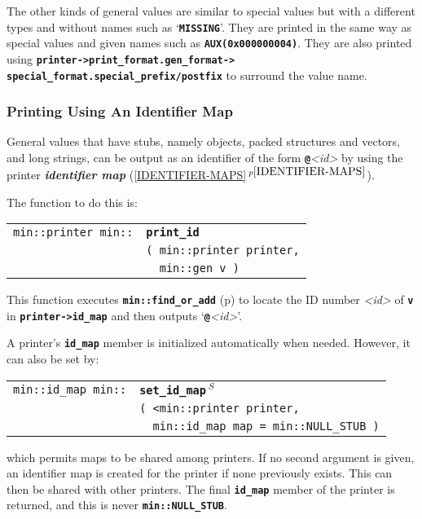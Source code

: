 \documentclass[12pt]{article}
\makeatletter
\newcommand{\TT}[1]{{\tt \bfseries #1}}
\newcommand{\key}[1]{{\bf \em #1}\index{#1}}
\newcommand{\ttindex}[1]{\index{#1@{\tt #1}}}
\newcommand{\itemref}[1]{\ref{#1}$\,^{p\pageref{#1}}$}
\newcommand{\pagref}[1]{p\pageref{#1}}
\newcommand{\EOL}{\penalty \exhyphenpenalty}
\newenvironment{indpar}[1][0.3in]%
	{\begin{list}{}%
		     {\setlength{\itemsep}{0in}%
		      \setlength{\topsep}{0in}%
		      \setlength{\parsep}{1ex}%
		      \setlength{\labelwidth}{#1}%
		      \setlength{\leftmargin}{#1}%
		      \addtolength{\leftmargin}{\labelsep}}%
	 \item}%
	{\end{list}}
\newcommand{\LABEL}[1]{\label{#1}}
\newlength{\ARGBREAKLENGTH}
\newcommand{\ARGBREAK}[1][\ARGBREAKLENGTH]{\\&\hspace*{#1}}
\newcommand{\MINKEY}[1]%
	   {\TT{#1}\ttindex{min::#1}\ttindex{#1}}
\newcommand{\RESIZE}{$\,^S$}
\makeatother
\begin{document}
The other kinds of general values are similar to special values but
with a different types and without names such as `\TT{MISSING}'.
They are printed in the same way as special values and given
names such as \TT{AUX(0x000000004)}.  They are also printed using
\TT{printer->\EOL print\_\EOL format.gen\_\EOL format->\EOL
special\_\EOL format.special\_\EOL prefix/\EOL postfix}
to surround the value name.


\subsubsection{Printing Using An Identifier Map}
\label{PRINTING-USING-AN-IDENTIFIER-MAP}

General values that have stubs, namely objects, packed structures and vectors,
and long strings, can be
output as an identifier of the form \TT{@}{\em <id>} by using
the printer \key{identifier map} (\itemref{IDENTIFIER-MAPS}).

The function to do this is:

\begin{indpar}[1em]\begin{tabular}{r@{}l}
\verb|min::printer min::| & \MINKEY{print\_id}\ARGBREAK
    \verb|( min::printer printer,|\ARGBREAK
    \verb|  min::gen v )|
\LABEL{MIN::PRINT_ID} \\
\end{tabular}\end{indpar}

This function executes
\TT{min::find\_or\_add} (\pagref{MIN::FIND_OR_ADD_OF_ID_MAP})
to locate the ID number {\em <id>} of
\TT{v} in \TT{printer->\EOL id\_\EOL map} and then outputs
`\TT{@}{\em <id>}'.

A printer's \TT{id\_map} member is initialized automatically when
needed.  However, it can also be set by:

\begin{indpar}[1em]\begin{tabular}{r@{}l}
\verb|min::id_map min::|
    & \MINKEY{set\_\EOL id\_\EOL map\RESIZE}\ARGBREAK
    \verb|( <min::printer printer,|\ARGBREAK
    \verb|  min::id_map map = min::NULL_STUB )|
\LABEL{MIN::SET_ID_MAP_OF_PRINTER} \\
\end{tabular}\end{indpar}

which permits maps to be shared among printers.  If no second argument
is given, an identifier map is created for the printer if none previously
exists.  This can then be shared with other printers.  The final
\TT{id\_\EOL map} member of the printer is returned, and this
is never \TT{min::\EOL NULL\_\EOL STUB}.
\end{document}
